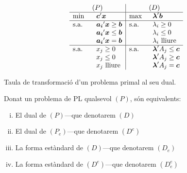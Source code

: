 \begin{table}[ht]
	\centering
	\setlength{\tabcolsep}{6ex}
	\renewcommand{\arraystretch}{1.5}
	\[
	\begin{array}{ll|ll}
		\multicolumn{2}{c|}{(P)}				
		&\multicolumn{2}{c}{(D)} \\
		\hline
		\min 	&\vb{c}'\vb{x}
		&\max 	&\vb{\lambda}'\vb{b}\\
		\hline
		\text{s.a.}\quad	&\vb{a_i}'\vb{x} \ge \vb{b}
		&\text{s.a.}\quad	&{\lambda_i} \ge 0\\
							&\vb{a_i}'\vb{x} \le \vb{b}
		&					&{\lambda_i} \le 0\\
							&\vb{a_i}'\vb{x} = \vb{b}
		&					&\lambda_i \text{ lliure}\\
		\hline
		\text{s.a.}\quad	&x_j \ge 0
		&\text{s.a.}\quad	&\vb{\lambda}'A_j \le \vb{c}\\
							&x_j \le 0
		&					&\vb{\lambda}'A_j \ge \vb{c}\\
							&x_j \text{ lliure}
		&					&\vb{\lambda}'A_j = \vb{c}\\
	\end{array}
	\]
	\caption{Taula de transformació d'un problema primal al seu dual.}\label{tab:dual}
\end{table}


\begin{prop}
	Donat un problema de PL qualsevol $(P)$, són equivalents:
	\begin{enumerate}[(i)]
		\item El dual de $(P)$---que denotarem $(D)$
		\item El dual de $(P_e)$---que denotarem $(D^e)$
		\item La forma estàndard de $(D)$---que denotarem $(D_e)$
		\item La forma estàndard de $(D^e)$---que denotarem $(D^e_e)$
	\end{enumerate}
\end{prop}

